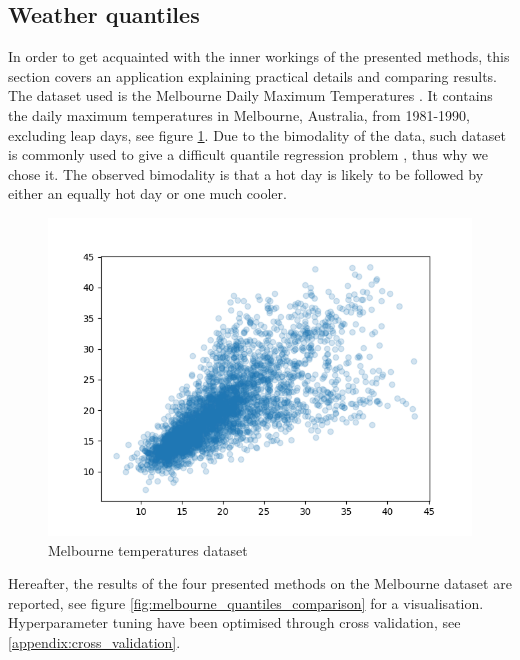 \subsection{Weather quantiles}
In order to get acquainted with the inner workings of the presented methods, this section covers an application explaining practical details and comparing results.
\\
The dataset used is the Melbourne Daily Maximum Temperatures \cite{hdrcde}. It contains the daily maximum temperatures in Melbourne, Australia, from 1981-1990, excluding leap days, see figure \ref{fig:melbourne_temperature_data}.
Due to the bimodality of the data, such dataset is commonly used to give a difficult quantile regression problem \cite{hyndman1996estimating}, thus why we chose it. The observed bimodality is that a hot day is likely to be followed by either an equally hot day or one much cooler.
\begin{figure}
    \includegraphics[width=\textwidth]{images/melbourne_temperature.png}
    \caption{Melbourne temperatures dataset}
    \label{fig:melbourne_temperature_data}
\end{figure}
Hereafter, the results of the four presented methods on the Melbourne dataset are reported, see figure \ref{fig:melbourne_quantiles_comparison} for a visualisation. Hyperparameter tuning have been optimised through cross validation, see \ref{appendix:cross_validation}.
